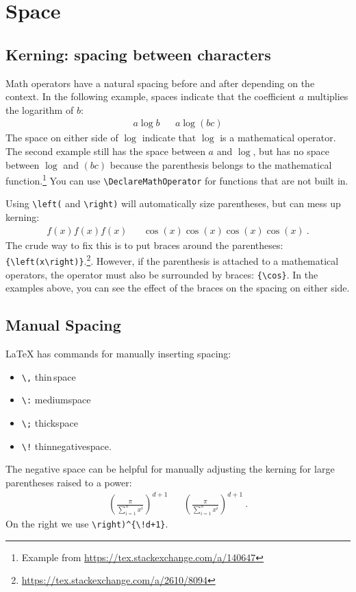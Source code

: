 \section{Space}

\subsection{Kerning: spacing between characters}
Math operators have a natural spacing before and after depending on the context. In the following example, spaces indicate that the coefficient $a$ multiplies the logarithm of $b$:
\begin{align}
	a\log b && a\log(bc)
\end{align}
The space on either side of $\log$ indicate that $\log$ is a mathematical operator. The second example still has the space between $a$ and $\log$, but has no space between $\log$ and $(bc)$ because the parenthesis belongs to the mathematical function.\footnote{Example from \url{https://tex.stackexchange.com/a/140647}}
% 
You can use \verb!\DeclareMathOperator! for functions that are not built in.

Using \verb!\left(! and \verb!\right)! will automatically size parentheses, but can mess up kerning:
\begin{align}
	f(x)
	f\left(x\right)
	f{\left(x\right)}
	&
	&
	\cos(x)
	\cos\left(x\right)
	\cos{\left(x\right)}
	{\cos}{\left(x\right)}
	\ .
\end{align}
The crude way to fix this is to put braces around the parentheses: \verb!{\left(x\right)}!.\footnote{\url{https://tex.stackexchange.com/a/2610/8094}}. However, if the parenthesis is attached to a mathematical operators, the operator must also be surrounded by braces: \verb!{\cos}!. In the examples above, you can see the effect of the braces on the spacing on either side.



\subsection{Manual Spacing}

\LaTeX{} has commands for manually inserting spacing: 
\begin{itemize}
	\item \verb!\,! thin\,space
	\item \verb!\:! medium\:space
	\item \verb!\;! thick\;space
	\item \verb$\!$ thin\!negative\!space.
\end{itemize}
The negative space can be helpful for manually adjusting the kerning for large parentheses raised to a power:
\begin{align}
	\left(\frac{\pi}{\sum_{i=1}^n x^i}\right)^{d+1}
	&&
	\left(\frac{\pi}{\sum_{i=1}^n x^i}\right)^{\!d+1}
	\ .
\end{align}
On the right we use \verb$\right)^{\!d+1}$.



